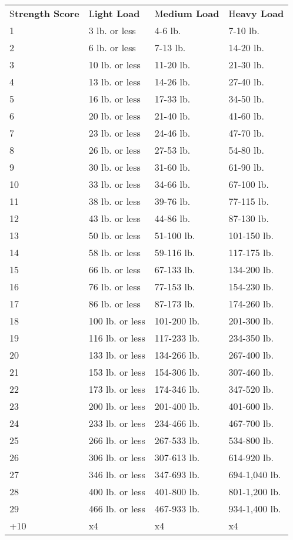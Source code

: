 \documentclass{article}
\begin{document}
\vspace{12pt}
\begin{tabular}{|>{\raggedright}p{67pt}|>{\raggedright}p{59pt}|>{\raggedright}p{64pt}|>{\raggedright}p{59pt}|}
\hline
\multicolumn{4}{|p{251pt}|}{\subsection*{T\textbf{able: Carrying Capacity}}}\tabularnewline
\hline
S\textbf{trength Score} & L\textbf{ight Load} & M\textbf{edium Load} & H\textbf{eavy 
Load}\tabularnewline
\hline
1 & 3 lb. or less & 4-6 lb. & 7-10 lb.\tabularnewline
\hline
2 & 6 lb. or less & 7-13 lb. & 14-20 lb.\tabularnewline
\hline
3 & 10 lb. or less & 11-20 lb. & 21-30 lb.\tabularnewline
\hline
4 & 13 lb. or less & 14-26 lb. & 27-40 lb.\tabularnewline
\hline
5 & 16 lb. or less & 17-33 lb. & 34-50 lb.\tabularnewline
\hline
6 & 20 lb. or less & 21-40 lb. & 41-60 lb.\tabularnewline
\hline
7 & 23 lb. or less & 24-46 lb. & 47-70 lb.\tabularnewline
\hline
8 & 26 lb. or less & 27-53 lb. & 54-80 lb.\tabularnewline
\hline
9 & 30 lb. or less & 31-60 lb. & 61-90 lb.\tabularnewline
\hline
10 & 33 lb. or less & 34-66 lb. & 67-100 lb.\tabularnewline
\hline
11 & 38 lb. or less & 39-76 lb. & 77-115 lb.\tabularnewline
\hline
12 & 43 lb. or less & 44-86 lb. & 87-130 lb.\tabularnewline
\hline
13 & 50 lb. or less & 51-100 lb. & 101-150 lb.\tabularnewline
\hline
14 & 58 lb. or less & 59-116 lb. & 117-175 lb.\tabularnewline
\hline
15 & 66 lb. or less & 67-133 lb. & 134-200 lb.\tabularnewline
\hline
16 & 76 lb. or less & 77-153 lb. & 154-230 lb.\tabularnewline
\hline
17 & 86 lb. or less & 87-173 lb. & 174-260 lb.\tabularnewline
\hline
18 & 100 lb. or less & 101-200 lb. & 201-300 lb.\tabularnewline
\hline
19 & 116 lb. or less & 117-233 lb. & 234-350 lb.\tabularnewline
\hline
20 & 133 lb. or less & 134-266 lb. & 267-400 lb.\tabularnewline
\hline
21 & 153 lb. or less & 154-306 lb. & 307-460 lb.\tabularnewline
\hline
22 & 173 lb. or less & 174-346 lb. & 347-520 lb.\tabularnewline
\hline
23 & 200 lb. or less & 201-400 lb. & 401-600 lb.\tabularnewline
\hline
24 & 233 lb. or less & 234-466 lb. & 467-700 lb.\tabularnewline
\hline
25 & 266 lb. or less & 267-533 lb. & 534-800 lb.\tabularnewline
\hline
26 & 306 lb. or less & 307-613 lb. & 614-920 lb.\tabularnewline
\hline
27 & 346 lb. or less & 347-693 lb. & 694-1,040 lb.\tabularnewline
\hline
28 & 400 lb. or less & 401-800 lb. & 801-1,200 lb.\tabularnewline
\hline
29 & 466 lb. or less & 467-933 lb. & 934-1,400 lb.\tabularnewline
\hline
+10 & x4 & x4 & x4\tabularnewline
\hline
\end{tabular}
\end{document}
